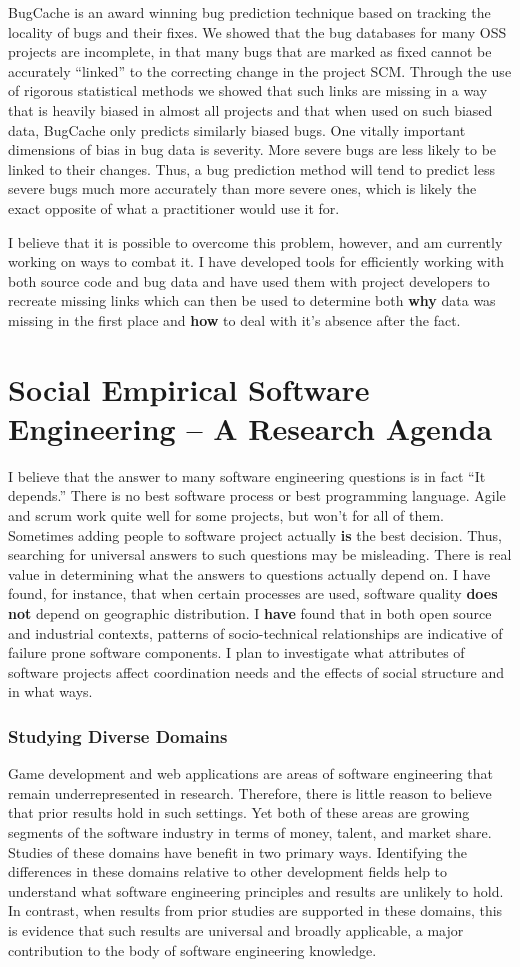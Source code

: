 \documentclass[10pt]{article}
\newcommand\Section[1]{\section*{#1}}
\newcommand\Subsection[1]{\subsubsection*{#1}}
\begin{document}
\begin{small}
BugCache is an award winning bug prediction technique based on tracking the
locality of bugs and their fixes.  We showed that the bug databases for many
OSS projects are incomplete, in that many bugs that are marked as fixed cannot
be accurately ``linked'' to the correcting change in the project SCM.  Through
the use of rigorous statistical methods we showed that such links are missing
in a way that is heavily biased in almost all projects and that when used on
such biased data, BugCache only predicts similarly biased bugs.  One vitally
important dimensions of bias in bug data is severity.  More severe bugs are
less likely to be linked to their changes.  Thus, a bug prediction method will
tend to predict less severe bugs much more accurately than more severe ones,
which is likely the exact opposite of what a practitioner would use it for.

I believe that it is possible to overcome this problem, however, and am
currently working on ways to combat it.  I have developed tools for efficiently
working with both source code and bug data and have used them with project
developers to recreate missing links which can then be used to determine both
\textbf{why} data was missing in the first place and \textbf{how} to deal with
it's absence after the fact.

\Section{Social Empirical Software Engineering -- A Research Agenda}

I believe that the answer to many software engineering questions is in fact
``It depends.'' There is no best software process or best programming
language.  Agile and scrum work quite well for some projects, but won't for all
of them.  Sometimes adding people to software project actually \textbf{is} the
best decision.  Thus, searching for universal answers to such questions may be
misleading.  There is real value in determining what the answers to questions
actually depend on.  I have found, for instance, that when certain processes
are used, software quality \textbf{does not} depend on geographic distribution.
I \textbf{have} found that in both open source and industrial contexts,
patterns of socio-technical relationships are indicative of failure prone
software components.  I plan to investigate what attributes of software
projects affect coordination needs and the effects of social structure and in what
ways. 

\Subsection{Studying Diverse Domains}

Game development and web applications are areas of software engineering that
remain underrepresented in research.  Therefore, there is little reason to believe
that prior results hold in such settings.  Yet both of these areas are growing
segments of the software industry in terms of money, talent, and market share.
Studies of these domains have benefit in two primary ways.  Identifying the
differences in these domains relative to other development fields help to
understand what software engineering principles and results are unlikely to
hold.  In contrast, when results from prior studies are supported
in these domains, this is evidence that such results are universal and broadly
applicable, a major contribution to the body of software engineering knowledge.


\end{small}
\end{document}
